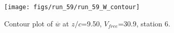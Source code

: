 \begin{figure}[H]
\centering
\texttt{[image: figs/run\_59/run\_59\_W\_contour]}
\caption{Contour plot of $\overline{w}$ at $z/c$=9.50, $V_{free}$=30.9, station 6.}
\end{figure}


